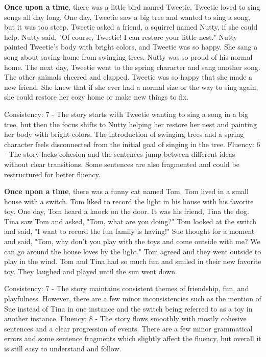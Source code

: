 \documentclass{article}
\begin{document}
\textbf{Once upon a time}, there was a little bird named Tweetie. Tweetie loved to sing songs all day long. One day, Tweetie saw a big tree and wanted to sing a song, but it was too steep. Tweetie asked a friend, a squirrel named Nutty, if she could help. Nutty said, "Of course, Tweetie! I can restore your little nest." Nutty painted Tweetie's body with bright colors, and Tweetie was so happy. She sang a song about saving home from swinging trees. Nutty was so proud of his normal home. The next day, Tweetie went to the spring character and sang another song. The other animals cheered and clapped. Tweetie was so happy that she made a new friend. She knew that if she ever had a normal size or the way to sing again, she could restore her cozy home or make new things to fix.

Consistency: 7 - The story starts with Tweetie wanting to sing a song in a big tree, but then the focus shifts to Nutty helping her restore her nest and painting her body with bright colors. The introduction of swinging trees and a spring character feels disconnected from the initial goal of singing in the tree.
Fluency: 6 - The story lacks cohesion and the sentences jump between different ideas without clear transitions. Some sentences are also fragmented and could be restructured for better fluency.

\textbf{Once upon a time}, there was a funny cat named Tom. Tom lived in a small house with a switch. Tom liked to record the light in his house with his favorite toy. One day, Tom heard a knock on the door. It was his friend, Tina the dog. Tina saw Tom and asked, "Tom, what are you doing?" Tom looked at the switch and said, "I want to record the fun family is having!" Sue thought for a moment and said, "Tom, why don't you play with the toys and come outside with me? We can go around the house loves by the light." Tom agreed and they went outside to play in the wind. Tom and Tina had so much fun and smiled in their new favorite toy. They laughed and played until the sun went down.

Consistency: 7 - The story maintains consistent themes of friendship, fun, and playfulness. However, there are a few minor inconsistencies such as the mention of Sue instead of Tina in one instance and the switch being referred to as a toy in another instance.
Fluency: 8 - The story flows smoothly with mostly cohesive sentences and a clear progression of events. There are a few minor grammatical errors and some sentence fragments which slightly affect the fluency, but overall it is still easy to understand and follow.
\end{document}
